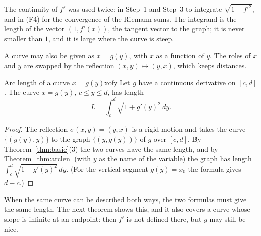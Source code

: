 \documentclass[11pt]{article}
\begin{document}
The continuity of $f'$ was used twice: in Step~1 and Step~3 to integrate $\sqrt{1+f'^2}$, and in (F4) for the convergence of the Riemann sums. The integrand is the length of the vector $(1,f'(x))$, the tangent vector to the graph; it is never smaller than $1$, and it is large where the curve is steep.

A curve may also be given as $x=g(y)$, with $x$ as a function of $y$. The roles of $x$ and $y$ are swapped by the reflection $(x,y)\mapsto(y,x)$, which keeps distances.

\begin{thm}{Arc length of a curve $x=g(y)$}{xofy}
Let $g$ have a continuous derivative on $[c,d]$. The curve $x=g(y)$, $c\le y\le d$, has length
\[
L=\int_c^d\sqrt{1+g'(y)^2}\,dy .
\]
\end{thm}
\begin{proof}
The reflection $\sigma(x,y)=(y,x)$ is a rigid motion and takes the curve $\{(g(y),y)\}$ to the graph $\{(y,g(y))\}$ of $g$ over $[c,d]$. By Theorem~\ref{thm:basic}(3) the two curves have the same length, and by Theorem~\ref{thm:arclen} (with $y$ as the name of the variable) the graph has length $\int_c^d\sqrt{1+g'(y)^2}\,dy$. (For the vertical segment $g(y)=x_0$ the formula gives $d-c$.)
\end{proof}

When the same curve can be described both ways, the two formulas must give the same length. The next theorem shows this, and it also covers a curve whose slope is infinite at an endpoint: then $f'$ is not defined there, but $g$ may still be nice.
\end{document}
